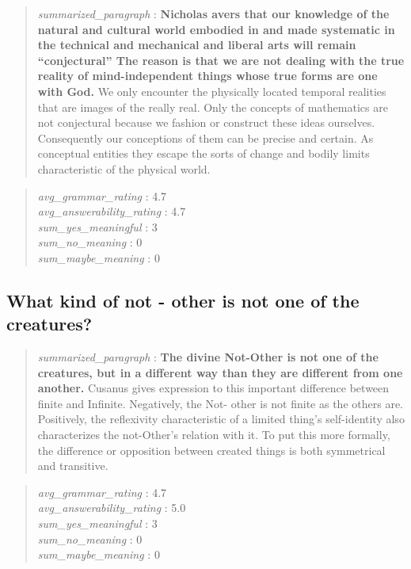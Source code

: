 \begin{quote}
\emph{summarized\_paragraph} : \textbf{Nicholas avers that our knowledge
of the natural and cultural world embodied in and made systematic in the
technical and mechanical and liberal arts will remain ``conjectural''
The reason is that we are not dealing with the true reality of
mind-independent things whose true forms are one with God.} We only
encounter the physically located temporal realities that are images of
the really real. Only the concepts of mathematics are not conjectural
because we fashion or construct these ideas ourselves. Consequently our
conceptions of them can be precise and certain. As conceptual entities
they escape the sorts of change and bodily limits characteristic of the
physical world.
\end{quote}

\begin{quote}
\emph{avg\_grammar\_rating} : 4.7\\
\emph{avg\_answerability\_rating} : 4.7\\
\emph{sum\_yes\_meaningful} : 3\\
\emph{sum\_no\_meaning} : 0\\
\emph{sum\_maybe\_meaning} : 0
\end{quote}

\hypertarget{what-kind-of-not---other-is-not-one-of-the-creatures}{%
\subsection{What kind of not - other is not one of the
creatures?}\label{what-kind-of-not---other-is-not-one-of-the-creatures}}

\begin{quote}
\emph{summarized\_paragraph} : \textbf{The divine Not-Other is not one
of the creatures, but in a different way than they are different from
one another.} Cusanus gives expression to this important difference
between finite and Infinite. Negatively, the Not- other is not finite as
the others are. Positively, the reflexivity characteristic of a limited
thing's self-identity also characterizes the not-Other's relation with
it. To put this more formally, the difference or opposition between
created things is both symmetrical and transitive.
\end{quote}

\begin{quote}
\emph{avg\_grammar\_rating} : 4.7\\
\emph{avg\_answerability\_rating} : 5.0\\
\emph{sum\_yes\_meaningful} : 3\\
\emph{sum\_no\_meaning} : 0\\
\emph{sum\_maybe\_meaning} : 0
\end{quote}

